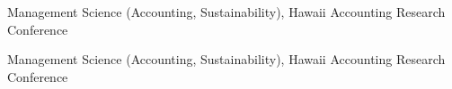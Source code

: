 

\begin{cventries}

    \cventrysimple
        {Management Science (Accounting, Sustainability), Hawaii Accounting Research Conference}  %
        {} %
        {}
    
\end{cventries}



\begin{cventries}

    \cventrysimple
        {Management Science (Accounting, Sustainability), Hawaii Accounting Research Conference}  %
        {} %
        {}
    
\end{cventries}
    

\vspace{.3cm}

